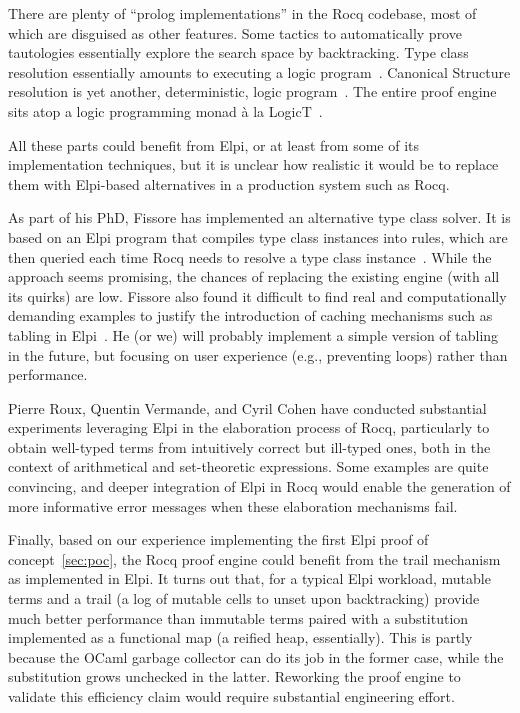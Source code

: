 \documentclass[a4paper, 11pt]{book}
\begin{document}
There are plenty of ``prolog implementations'' in the Rocq codebase, most of
which are disguised as other features. Some tactics to automatically prove
tautologies essentially explore the search space by backtracking. Type class
resolution essentially amounts to executing a logic program~\cite{fctc}.
Canonical Structure resolution is yet another, deterministic, logic
program~\cite{tassi13}. The entire proof engine sits atop a logic programming
monad à la LogicT~\cite{logicT}.

All these parts could benefit from Elpi, or at least from some of its
implementation techniques, but it is unclear how realistic it would be to
replace them with Elpi-based alternatives in a production system such as Rocq.

As part of his PhD, Fissore has implemented an alternative type class solver.
It is based on an Elpi program that compiles type class instances into rules,
which are then queried each time Rocq needs to resolve a type class
instance~\cite{newtc,unifforfree}. While the approach seems promising, the
chances of replacing the existing engine (with all its quirks) are low. Fissore
also found it difficult to find real and computationally demanding examples to
justify the introduction of caching mechanisms such as tabling in
Elpi~\cite{selsam2020tabledtypeclassresolution,brigittePHD}. He (or we) will
probably implement a simple version of tabling in the future, but focusing on
user experience (e.g., preventing loops) rather than performance.

Pierre Roux, Quentin Vermande, and Cyril Cohen have conducted substantial
experiments leveraging Elpi in the elaboration process of Rocq, particularly to
obtain well-typed terms from intuitively correct but ill-typed ones, both in
the context of arithmetical and set-theoretic expressions. Some examples are
quite convincing, and deeper integration of Elpi in Rocq would enable the
generation of more informative error messages when these elaboration mechanisms
fail.

Finally, based on our experience implementing the first Elpi proof of
concept~\cref{sec:poc}, the Rocq proof engine could benefit from the trail
mechanism as implemented in Elpi. It turns out that, for a typical Elpi
workload, mutable terms and a trail (a log of mutable cells to unset upon
backtracking) provide much better performance than immutable terms paired with
a substitution implemented as a functional map (a reified heap, essentially).
This is partly because the OCaml garbage collector can do its job in the former
case, while the substitution grows unchecked in the latter. Reworking the proof
engine to validate this efficiency claim would require substantial engineering
effort.

\nocite{*}
\printbibliography[title={Our Bibliography}, keyword=me]
\printbibliography[title={Bibliography}, keyword=they]
\end{document}
